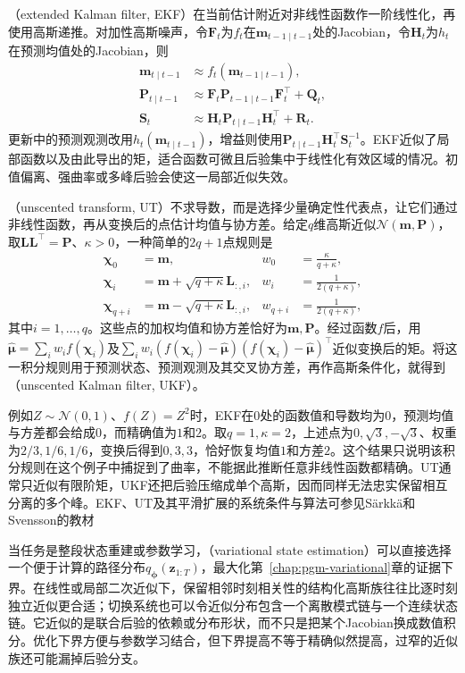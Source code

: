 （extended Kalman filter, EKF）在当前估计附近对非线性函数作一阶线性化，再使用高斯递推。对加性高斯噪声，令$\bm F_t$为$f_t$在$\bm m_{t-1\mid t-1}$处的Jacobian，令$\bm H_t$为$h_t$在预测均值处的Jacobian，则
\[
  \begin{aligned}
    \bm m_{t\mid t-1}&\approx f_t(\bm m_{t-1\mid t-1}),\\
    \bm P_{t\mid t-1}
      &\approx\bm F_t\bm P_{t-1\mid t-1}\bm F_t^\top+\bm Q_t,\\
    \bm S_t&\approx\bm H_t\bm P_{t\mid t-1}\bm H_t^\top+\bm R_t.
  \end{aligned}
\]
更新中的预测观测改用$h_t(\bm m_{t\mid t-1})$，增益则使用$\bm P_{t\mid t-1}\bm H_t^\top\bm S_t^{-1}$。EKF近似了局部函数以及由此导出的矩，适合函数可微且后验集中于线性化有效区域的情况。初值偏离、强曲率或多峰后验会使这一局部近似失效。

（unscented transform, UT）不求导数，而是选择少量确定性代表点，让它们通过非线性函数，再从变换后的点估计均值与协方差。给定$q$维高斯近似$\mathcal N(\bm m,\bm P)$，取$\bm L\bm L^\top=\bm P$、$\kappa>0$，一种简单的$2q+1$点规则是
\[
  \begin{aligned}
    \bm\chi_0&=\bm m,&w_0&=\frac{\kappa}{q+\kappa},\\
    \bm\chi_i&=\bm m+\sqrt{q+\kappa}\bm L_{:,i},
      &w_i&=\frac{1}{2(q+\kappa)},\\
    \bm\chi_{q+i}&=\bm m-\sqrt{q+\kappa}\bm L_{:,i},
      &w_{q+i}&=\frac{1}{2(q+\kappa)},
  \end{aligned}
\]
其中$i=1,\ldots,q$。这些点的加权均值和协方差恰好为$\bm m,\bm P$。经过函数$f$后，用$\widehat{\bm\mu}=\sum_iw_i f(\bm\chi_i)$及$\sum_iw_i(f(\bm\chi_i)-\widehat{\bm\mu})(f(\bm\chi_i)-\widehat{\bm\mu})^\top$近似变换后的矩。将这一积分规则用于预测状态、预测观测及其交叉协方差，再作高斯条件化，就得到（unscented Kalman filter, UKF）。

例如$Z\sim\mathcal N(0,1)$、$f(Z)=Z^2$时，EKF在$0$处的函数值和导数均为$0$，预测均值与方差都会给成$0$，而精确值为$1$和$2$。取$q=1,\kappa=2$，上述点为$0,\sqrt3,-\sqrt3$、权重为$2/3,1/6,1/6$，变换后得到$0,3,3$，恰好恢复均值$1$和方差$2$。这个结果只说明该积分规则在这个例子中捕捉到了曲率，不能据此推断任意非线性函数都精确。UT通常只近似有限阶矩，UKF还把后验压缩成单个高斯，因而同样无法忠实保留相互分离的多个峰。EKF、UT及其平滑扩展的系统条件与算法可参见Särkkä和Svensson的教材

当任务是整段状态重建或参数学习，（variational state estimation）可以直接选择一个便于计算的路径分布$q_{\bm\phi}(\bm z_{1:T})$，最大化第~\ref{chap:pgm-variational}章的证据下界。在线性或局部二次近似下，保留相邻时刻相关性的结构化高斯族往往比逐时刻独立近似更合适；切换系统也可以令近似分布包含一个离散模式链与一个连续状态链。它近似的是联合后验的依赖或分布形状，而不只是把某个Jacobian换成数值积分。优化下界方便与参数学习结合，但下界提高不等于精确似然提高，过窄的近似族还可能漏掉后验分支。

